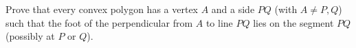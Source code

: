 Prove that every convex polygon has a vertex $A$ and a side $PQ$ (with $A\ne P,Q$) such that the foot of the perpendicular from $A$ to line $PQ$ lies on the segment $PQ$ (possibly at $P$ or $Q$).

